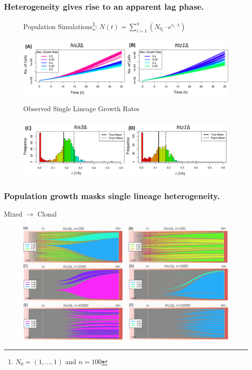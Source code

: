 \documentclass{beamer}
\begin{document}
\begin{frame}
\frametitle{Heterogeneity gives rise to an apparent lag phase.}
\begin{figure}
Population Simulations\footnote{$N_{0}=(1,...,1)$ and $n=100$}: $N(t)=\sum_{i=1}^{n}(N_{0_{i}}\cdot e^{r_{i}\cdot t})$ \\~\\
\includegraphics[width=0.8\linewidth]{PopSimCol1.png}
\end{figure}
\begin{figure}
Observed Single Lineage Growth Rates \\~\\
\includegraphics[width=0.8\linewidth]{PopSimCol2.png}
\end{figure}
\end{frame}

\begin{frame}
\frametitle{Population growth masks single lineage heterogeneity.}
\centering
Mixed $\rightarrow$ Clonal 
\begin{figure}
\includegraphics[width=0.9\linewidth]{FishPlot3_Names.png}
\end{figure}
\end{frame}

\end{document}
